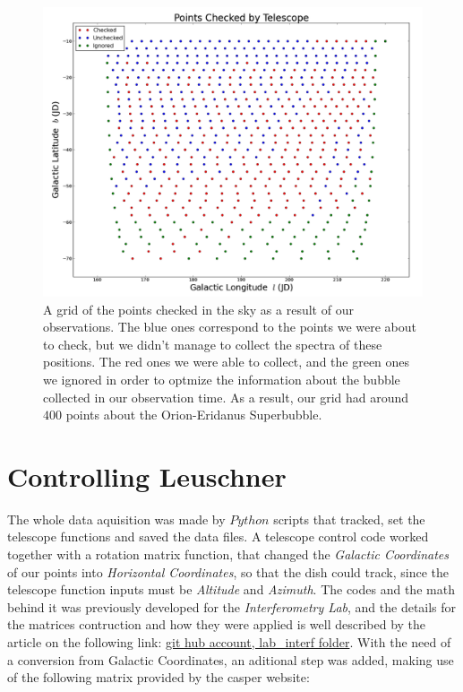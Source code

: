 \documentclass{article}
\begin{document}
\begin{figure}[H]
\center
\includegraphics[scale=0.41]{grid.png}
\caption {A grid of the points checked in the sky as a result of our observations. The blue ones correspond
to the points we were about to check, but we didn't manage to collect the spectra of these positions. The
red ones we were able to collect, and the green ones we ignored in order to optmize the information about
the bubble collected in our observation time. As a result, our grid had around $400$ points about
the Orion-Eridanus Superbubble.} 
\label{Fig:1}
\end{figure}


\section{Controlling Leuschner}

The whole data aquisition was made by $Python$ scripts that tracked, set the telescope functions and
saved the data files. A telescope control code worked together with a rotation matrix function,
that changed the \emph{Galactic Coordinates} of our points into \emph{Horizontal Coordinates}, so that the
dish could track, since the telescope function inputs must be \emph{Altitude} and \emph{Azimuth}. The codes and
the math behind it was previously developed for the \emph{Interferometry Lab}, and the details for the
matrices contruction and how they were applied is well described by the article on the following link:
\href{https://github.com/leosattler/ugradio/tree/master/lab_interf}{git hub account, lab\_interf folder}. With the
need of a conversion from Galactic Coordinates, an aditional step was added, making use of the following
matrix provided by the casper website:
\end{document}
